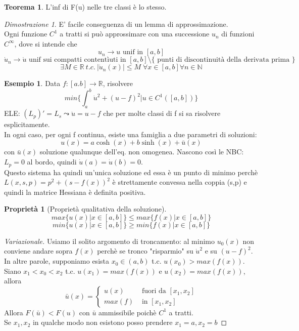 \documentclass[a4paper]{book}
\theoremstyle{definition}
\newtheorem{ex}{Esempio}
\theoremstyle{remark}
\newtheorem{dimst}{Dimostrazione}
\theoremstyle{definition}
\newtheorem{teo}{Teorema}
\newtheorem{prop}{Proprietà}
\newcommand{\bbr}{\mathbb{R}}
\begin{document}
\begin{teo}
	L'inf di F(u) nelle tre classi è lo stesso.
\end{teo}

\begin{dimst}
	E' facile conseguenza di un lemma di approssimazione.\\
	Ogni funzione $ C^1 $ a tratti si può approssimare con una successione $ {u_n} $ di funzioni $ C^\infty $, dove si intende che 
	\[
	u_n \to u \text{ unif in } [a,b]\]
	\[
	\dot{u}_n \to \dot{u} \text{ unif sui compatti contentìuti in } [a,b] \setminus \{ \text{ punti di discontinuità della derivata prima } \} \]
	\[
	\exists M \in \bbr \: t.c.\: |\dot{u}_n(x)|\le M \; \forall x \in [a,b] \forall n \in \mathbb{N}
	 \]
\end{dimst}

\begin{ex}
	Data $ f:[a.b] \to\bbr$, risolvere
	\[ min\{\int_{a}^{b} \dot{u}^2 + (u-f)^2 | u \in C^1([a,b])\} \]
	ELE: $ (L_p)' = L_s \leadsto  \ddot{u} = u-f$ che per molte classi di f si sa risolvere esplicitamente.\\
	In ogni caso, per ogni f continua, esiste una famiglia a due parametri di soluzioni:\\
	\[ u(x)  = a\cosh (x) +b \sinh (x) +  \bar{u}(x) \]
	con $ \bar{u}(x) $ soluzione qualunque dell'eq. non omogenea.
	Nascono così le NBC: $L_p = 0$ al bordo, quindi $\dot{u}(a) = \dot{u}(b) = 0$.
	\\
	Questo sistema ha quindi un'unica soluzione ed essa è un punto di minimo perchè $L(x,s,p) = p^2 + (s-f(x))^2$ è strettamente convessa nella coppia (s,p) e quindi la matrice Hessiana è definita positiva.
	

\end{ex}

\begin{prop}[Proprietà qualitativa della soluzione]
	$$max\{u(x)|x \in [a,b]\} \le max\{f(x)|x \in [a,b]\}$$
	$$min\{u(x)|x \in [a,b]\} \ge min\{f(x)|x \in [a,b]\}$$
	
	
\end{prop}

\begin{proof}[Variazionale]
	Usiamo il solito argomento di troncamento: al minimo $u_0(x)$ non conviene andare sopra $f(x)$ perchè se tronco "risparmio" su $\dot{u}^2$ e su $(u-f)^2$. In altre parole, supponiamo esista $x_0 \in (a,b)$ t.c. $u(x_0)> max(f(x))$.\\
	Siano $x_1 < x_0 < x_2$ t.c. $u(x_1) = max(f(x))$ e $u(x_2) = max(f(x))$, allora
	$$
	\bar{u}(x)=
	\begin{cases}
		u(x) & \text{ fuori da } [x_1, x_2]\\
		max(f) & \text{ in } [x_1,x_2]
	\end{cases}
	$$
	Allora $F(\bar{u})<F(u)$ con $\bar{u}$ ammissibile poichè $C^1$ a tratti.\\
	Se $x_1, x_2$ in qualche modo non esistono posso prendere $x_1 = a, x_2 = b$
\end{proof}
\end{document}
